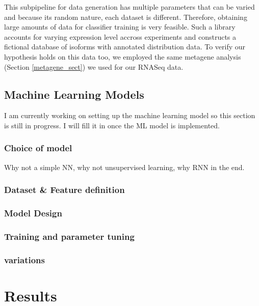 \documentclass[12pt]{article}
\begin{document}
This subpipeline for data generation has multiple parameters that can be varied and because its random nature, each dataset is different. Therefore, obtaining large amounts of data for classifier training is very feasible. Such a library accounts for varying expression level accross experiments and constructs a fictional database of isoforms with annotated distribution data. To verify our hypothesis holds on this data too, we employed the same metagene analysis (Section \ref{metagene_sect}) we used for our RNASeq data.  

\subsection{Machine Learning Models}
I am currently working on setting up the machine learning model so this section is still in progress. I will fill it in once the ML model is implemented. 
\subsubsection{Choice of model}
Why not a simple NN, why not unsupervised learning, why RNN in the end. 
\subsubsection{Dataset \& Feature definition}
\subsubsection{Model Design}
\subsubsection{Training and parameter tuning}
\subsubsection{variations}




\section{Results}\label{res}
\end{document}
